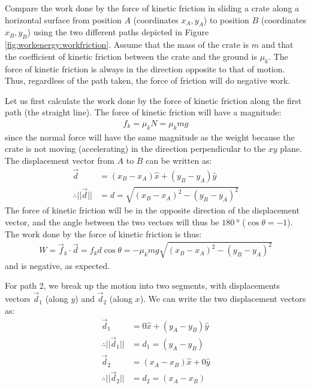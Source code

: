 \begin{example}{\label{ex:workenergy:workfriction}
Compare the work done by the force of kinetic friction in sliding a crate along a horizontal surface from position $A$ (coordinates $x_A, y_A$) to position $B$ (coordinates $x_B, y_B$) using the two different paths depicted in Figure \ref{fig:workenergy:workfriction}. Assume that the mass of the crate is $m$ and that the coefficient of kinetic friction between the crate and the ground is $\mu_k$.
}
The force of kinetic friction is always in the direction opposite to that of motion. Thus, regardless of the path taken, the force of friction will do negative work. 

Let us first calculate the work done by the force of kinetic friction along the first path (the straight line). The force of kinetic friction will have a magnitude:
\begin{align*}
f_k = \mu_k N = \mu_k mg
\end{align*}
since the normal force will have the same magnitude as the weight because the crate is not moving (accelerating) in the direction perpendicular to the $xy$ plane.  The displacement vector from $A$ to $B$ can be written as:
\begin{align*}
\vec d &= (x_B-x_A)\hat x + (y_B-y_A) \hat y\\
\therefore ||\vec d|| &=d= \sqrt{(x_B-x_A)^2 - (y_B-y_A)^2}
\end{align*}  
The force of kinetic friction will be in the opposite direction of the displacement vector, and the angle between the two vectors will thus be $\SI{180}{\degree}$ ($\cos\theta=-1$). The work done by the force of kinetic friction is thus:
\begin{align*}
W = \vec f_k \cdot\vec d = f_k d \cos\theta = -\mu_k mg\sqrt{(x_B-x_A)^2 - (y_B-y_A)^2}
\end{align*}
and is negative, as expected.

For path 2, we break up the motion into two segments, with displacements vectors $\vec d_1$ (along $y$) and $\vec d_2$ (along $x$). We can write the two displacement vectors as:
\begin{align*}
\vec d_1 &= 0\hat x + (y_A-y_B) \hat y\\
\therefore ||\vec d_1||&=d_1=(y_A-y_B)\\
\vec d_2 &= (x_A-x_B)\hat x + 0 \hat y\\
\therefore ||\vec d_2||&=d_2=(x_A-x_B)\\
\end{align*}


\end{example}
